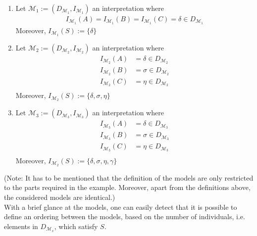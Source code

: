 \documentclass{article}
\begin{document}
\begin{enumerate}

\item Let $\mathcal{M}_1:=(D_{\mathcal{M}_1}, I_{\mathcal{M}_1})$ an interpretation where
\begin{equation*}
\begin{split}
I_{\mathcal{M}_1}(A)= I_{\mathcal{M}_1}(B) = I_{\mathcal{M}_1}(C)  = \delta \in D_{\mathcal{M}_1}
\end{split}
\end{equation*}
Moreover, $I_{\mathcal{M}_1}(S):=\{\delta\}$

\item Let $\mathcal{M}_2:=(D_{\mathcal{M}_2}, I_{\mathcal{M}_2})$ an interpretation where
\begin{equation*}
\begin{split}
I_{\mathcal{M}_2}(A) &= \delta \in D_{\mathcal{M}_2} \\
I_{\mathcal{M}_2}(B) &= \sigma \in D_{\mathcal{M}_2} \\
I_{\mathcal{M}_2}(C) &= \eta \in D_{\mathcal{M}_2} \\
\end{split}
\end{equation*}
Moreover, $I_{\mathcal{M}_2}(S):=\{\delta, \sigma, \eta\}$

\item Let $\mathcal{M}_3:=(D_{\mathcal{M}_3}, I_{\mathcal{M}_3})$ an interpretation where
\begin{equation*}
\begin{split}
I_{\mathcal{M}_3}(A) &= \delta \in D_{\mathcal{M}_3} \\
I_{\mathcal{M}_3}(B) &= \sigma \in D_{\mathcal{M}_3} \\
I_{\mathcal{M}_3}(C) &= \eta \in D_{\mathcal{M}_3} \\
\end{split}
\end{equation*}
Moreover, $I_{\mathcal{M}_2}(S):=\{\delta, \sigma, \eta, \gamma\}$

\end{enumerate}
(Note: It has to be mentioned that the definition of the models are only restricted to the parts  required in the example. Moreover, apart from the definitions above, the considered models are identical.)\\
With a brief glance at the models, one can easily detect that it is possible to define an ordering between the models, based on the number of individuals, i.e. elements in $D_{\mathcal{M}_x}$, which satisfy $S$. 
\end{document}
